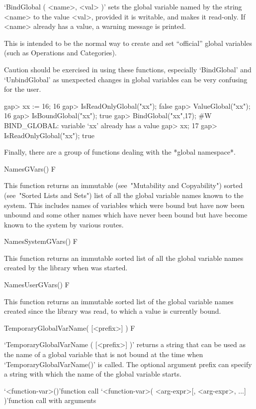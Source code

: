 {`BindGlobal ( <name>, <val> )' sets the global variable named by the
string <name> to the value <val>, provided it is writable, and makes
it read-only. If <name> already has a value, a warning message is
printed.  

This is intended to be the normal way to create and set ``official''
global variables (such as Operations and Categories).  

Caution should be exercised in using these functions, especially
`BindGlobal' and `UnbindGlobal' as unexpected changes in global
variables can be very confusing for the user.

\beginexample
gap> xx := 16;
16
gap> IsReadOnlyGlobal("xx");   
false
gap> ValueGlobal("xx");
16
gap> IsBoundGlobal("xx");
true
gap> BindGlobal("xx",17);
#W BIND_GLOBAL: variable `xx' already has a value
gap> xx;
17
gap> IsReadOnlyGlobal("xx");
true
\endexample

Finally, there are a group of functions dealing with the *global
namespace*.

\>NamesGVars() F

This function returns an immutable (see~"Mutability and Copyability") sorted
(see~"Sorted Lists and Sets") list of all the global
variable names known to the system.  This includes names of variables
which were bound but have now been unbound and some other names which
have never been bound but have become known to the system by various
routes.

\>NamesSystemGVars() F

This function returns an immutable sorted list of all the global
variable names created by the {\GAP} library when {\GAP} was started.

\>NamesUserGVars() F

This function returns an immutable sorted list of the global variable
names created since the library was read, to which a value is
currently bound.

\>TemporaryGlobalVarName( [<prefix>] ) F

`TemporaryGlobalVarName ( [<prefix>]  )' returns a string  that can be used
as the  name  of a global  variable  that is not bound   at the time when
`TemporaryGlobalVarName()'  is called.    The optional  argument prefix can
specify a string with which the name of the global variable starts.


\>`<function-var>()'{function call}
\>`<function-var>( <arg-expr>[, <arg-expr>, ...] )'{function call with arguments}

}
